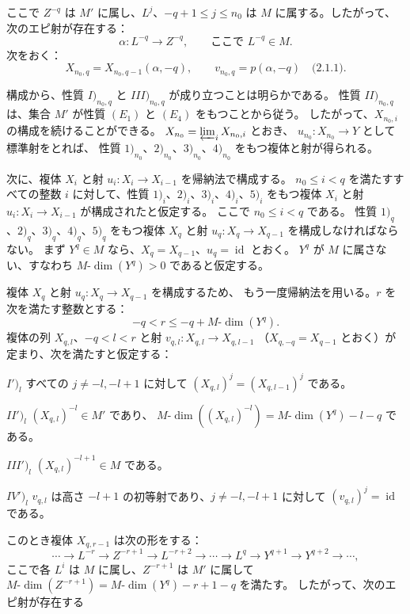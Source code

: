 \clearpage
{}%
\begingroup\small\setlength{\parskip}{0pt}\setlength{\emergencystretch}{1.5em}
\setlength{\abovedisplayskip}{4pt plus 2pt minus 2pt}%
\setlength{\belowdisplayskip}{4pt plus 2pt minus 2pt}%

ここで $Z^{-q}$ は $M'$ に属し、$L^j$、$-q+1\leq j\leq n_0$ は
$M$ に属する。したがって、次のエピ射が存在する：
\[
\alpha\colon L^{-q}\longrightarrow Z^{-q},
\qquad\text{ここで }L^{-q}\in M.
\]
次をおく：
\[
X_{n_0,q}=X_{n_0,q-1}(\alpha,-q),
\qquad
v_{n_0,q}=p(\alpha,-q)\quad\text{(2.1.1)}.
\]

構成から、性質 $I)_{n_0,q}$ と $III)_{n_0,q}$ が成り立つことは明らかである。
性質 $II)_{n_0,q}$ は、集合 $M'$ が性質 $(E_1)$ と $(E_4)$ をもつことから従う。
したがって、$X_{n_0,i}$ の構成を続けることができる。
$X_{n_0}=\varprojlim_i X_{n_0,i}$ とおき、
$u_{n_0}\colon X_{n_0}\longrightarrow Y$ として標準射をとれば、
性質 $1)_{n_0}$、$2)_{n_0}$、$3)_{n_0}$、$4)_{n_0}$ をもつ複体と射が得られる。

次に、複体 $X_i$ と射 $u_i\colon X_i\longrightarrow X_{i-1}$ を帰納法で構成する。
$n_0\leq i<q$ を満たすすべての整数 $i$ に対して、性質
$1)_i$、$2)_i$、$3)_i$、$4)_i$、$5)_i$ をもつ複体 $X_i$ と射
$u_i\colon X_i\longrightarrow X_{i-1}$ が構成されたと仮定する。
ここで $n_0\leq i<q$ である。
性質 $1)_q$、$2)_q$、$3)_q$、$4)_q$、$5)_q$ をもつ複体 $X_q$ と射
$u_q\colon X_q\longrightarrow X_{q-1}$ を構成しなければならない。
まず $Y^q\in M$ なら、$X_q=X_{q-1}$、$u_q=\operatorname{id}$ とおく。
$Y^q$ が $M$ に属さない、すなわち $M\text{-}\dim(Y^q)>0$ であると仮定する。

複体 $X_q$ と射 $u_q\colon X_q\longrightarrow X_{q-1}$ を構成するため、
もう一度帰納法を用いる。$r$ を次を満たす整数とする：
\[
-q<r\leq -q+M\text{-}\dim(Y^q).
\]
複体の列 $X_{q,l}$、$-q<l<r$ と射
$v_{q,l}\colon X_{q,l}\longrightarrow X_{q,l-1}$
（$X_{q,-q}=X_{q-1}$ とおく）が定まり、次を満たすと仮定する：

\noindent$I')_l$
すべての $j\neq-l,-l+1$ に対して
$(X_{q,l})^j=(X_{q,l-1})^j$ である。

\noindent$II')_l$
$(X_{q,l})^{-l}\in M'$ であり、
$M\text{-}\dim((X_{q,l})^{-l})=M\text{-}\dim(Y^q)-l-q$ である。

\noindent$III')_l$
$(X_{q,l})^{-l+1}\in M$ である。

\noindent$IV')_l$
$v_{q,l}$ は高さ $-l+1$ の初等射であり、$j\neq-l,-l+1$ に対して
$(v_{q,l})^j=\operatorname{id}$ である。

このとき複体 $X_{q,r-1}$ は次の形をする：
\[
\cdots\longrightarrow L^{-r}\longrightarrow Z^{-r+1}
\longrightarrow L^{-r+2}\longrightarrow\cdots\longrightarrow L^q
\longrightarrow Y^{q+1}\longrightarrow Y^{q+2}\longrightarrow\cdots,
\]
ここで各 $L^i$ は $M$ に属し、$Z^{-r+1}$ は $M'$ に属して
$M\text{-}\dim(Z^{-r+1})=M\text{-}\dim(Y^q)-r+1-q$ を満たす。
したがって、次のエピ射が存在する
\endgroup
